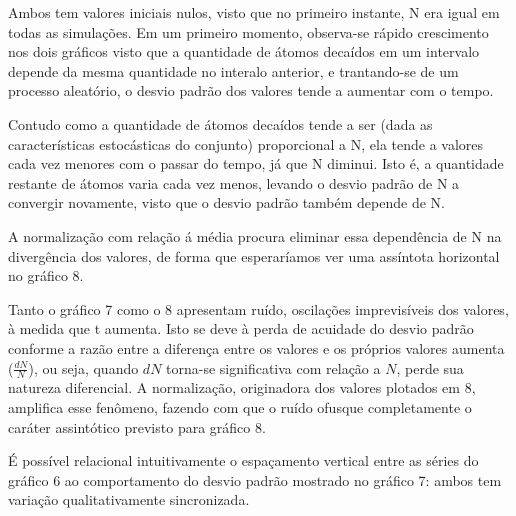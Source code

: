 \message{ !name(relatorio.tex)}\documentclass{article}
\begin{document}
Ambos tem valores iniciais nulos, visto que no primeiro instante, N era igual em todas as simulações. Em um primeiro momento, observa-se rápido crescimento nos dois gráficos visto que a quantidade de átomos decaídos em um intervalo depende da mesma quantidade no interalo anterior, e trantando-se de um processo aleatório, o desvio padrão dos valores tende a aumentar com o tempo.\par
Contudo como a quantidade de átomos decaídos tende a ser (dada as características estocásticas do conjunto) proporcional a N, ela tende a valores cada vez menores com o passar do tempo, já que N diminui. Isto é, a quantidade restante de átomos varia cada vez menos, levando o desvio padrão de N a convergir novamente, visto que o desvio padrão também depende de N.\par
A normalização com relação á média procura eliminar essa dependência de N na divergência dos valores, de forma que esperaríamos ver uma assíntota horizontal no gráfico 8.\par

Tanto o gráfico 7 como o 8 apresentam ruído, oscilações imprevisíveis dos valores, à medida que t aumenta. Isto se deve à perda de acuidade do desvio padrão conforme a razão entre a diferença entre os valores e os próprios valores aumenta ($\frac{dN}{N}$), ou seja, quando $dN$ torna-se significativa com relação a $N$, perde sua natureza diferencial. A normalização, originadora dos valores plotados em 8, amplifica esse fenômeno, fazendo com que o ruído ofusque completamente o caráter assintótico previsto para gráfico 8.\par

É possível relacional intuitivamente o espaçamento vertical entre as séries do gráfico 6 ao comportamento do desvio padrão mostrado no gráfico 7: ambos tem variação qualitativamente sincronizada.\par
\end{document}
